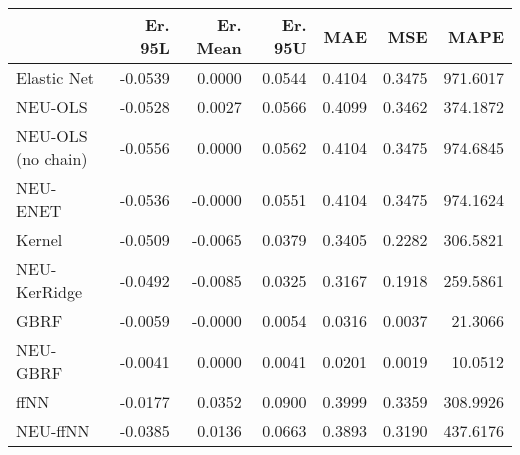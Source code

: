 \begin{tabular}{lrrrrrr}
\toprule
{} &  Er. 95L &  Er. Mean &  Er. 95U &    MAE &    MSE &     MAPE \\
\midrule
Elastic Net        &  -0.0539 &    0.0000 &   0.0544 & 0.4104 & 0.3475 & 971.6017 \\
NEU-OLS            &  -0.0528 &    0.0027 &   0.0566 & 0.4099 & 0.3462 & 374.1872 \\
NEU-OLS (no chain) &  -0.0556 &    0.0000 &   0.0562 & 0.4104 & 0.3475 & 974.6845 \\
NEU-ENET           &  -0.0536 &   -0.0000 &   0.0551 & 0.4104 & 0.3475 & 974.1624 \\
Kernel             &  -0.0509 &   -0.0065 &   0.0379 & 0.3405 & 0.2282 & 306.5821 \\
NEU-KerRidge       &  -0.0492 &   -0.0085 &   0.0325 & 0.3167 & 0.1918 & 259.5861 \\
GBRF               &  -0.0059 &   -0.0000 &   0.0054 & 0.0316 & 0.0037 &  21.3066 \\
NEU-GBRF           &  -0.0041 &    0.0000 &   0.0041 & 0.0201 & 0.0019 &  10.0512 \\
ffNN               &  -0.0177 &    0.0352 &   0.0900 & 0.3999 & 0.3359 & 308.9926 \\
NEU-ffNN           &  -0.0385 &    0.0136 &   0.0663 & 0.3893 & 0.3190 & 437.6176 \\
\bottomrule
\end{tabular}
